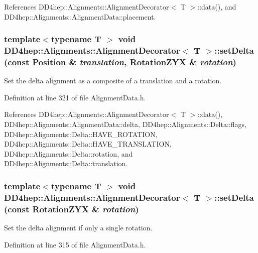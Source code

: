 References DD4hep::Alignments::AlignmentDecorator$<$ T $>$::data(), and DD4hep::Alignments::AlignmentData::placement.\hypertarget{class_d_d4hep_1_1_alignments_1_1_alignment_decorator_a123e789de1fa9b3c4cb0149d6831b287}{
\subsubsection[{setDelta}]{\setlength{\rightskip}{0pt plus 5cm}template$<$typename T $>$ void {\bf DD4hep::Alignments::AlignmentDecorator}$<$ {\bf T} $>$::setDelta (const Position \& {\em translation}, \/  RotationZYX \& {\em rotation})}}
\label{class_d_d4hep_1_1_alignments_1_1_alignment_decorator_a123e789de1fa9b3c4cb0149d6831b287}


Set the delta alignment as a composite of a translation and a rotation. 

Definition at line 321 of file AlignmentData.h.

References DD4hep::Alignments::AlignmentDecorator$<$ T $>$::data(), DD4hep::Alignments::AlignmentData::delta, DD4hep::Alignments::Delta::flags, DD4hep::Alignments::Delta::HAVE\_\-ROTATION, DD4hep::Alignments::Delta::HAVE\_\-TRANSLATION, DD4hep::Alignments::Delta::rotation, and DD4hep::Alignments::Delta::translation.\hypertarget{class_d_d4hep_1_1_alignments_1_1_alignment_decorator_a27ae7e7f8aba1fed3c76ab63f985a627}{
\subsubsection[{setDelta}]{\setlength{\rightskip}{0pt plus 5cm}template$<$typename T $>$ void {\bf DD4hep::Alignments::AlignmentDecorator}$<$ {\bf T} $>$::setDelta (const RotationZYX \& {\em rotation})}}
\label{class_d_d4hep_1_1_alignments_1_1_alignment_decorator_a27ae7e7f8aba1fed3c76ab63f985a627}


Set the delta alignment if only a single rotation. 

Definition at line 315 of file AlignmentData.h.

